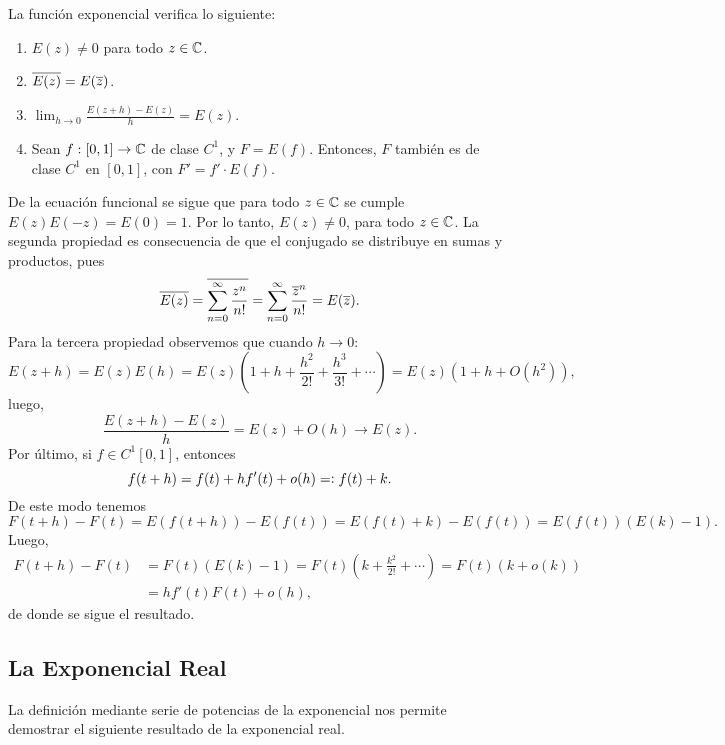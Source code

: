 \begin{theo}\label{teo-propiedades-exp}
    La función exponencial verifica lo siguiente:
    \begin{enumerate}
        \item $E(z)\neq 0$ para todo $z\in \mathbb{C}$.
        \item $\overline{E(z)} = E(\overline{z})$.
        \item $\displaystyle \lim_{h \rightarrow 0} \frac{E(z+h) - E(z)}{h} = E(z)$.
        \item Sean $f: [0,1] \rightarrow \mathbb{C}$ de clase $C^1$, y $F = E(f)$. Entonces, $F$ también es de clase
        $C^1$ en $[0,1]$, con $F' = f'\cdot E(f)$.
    \end{enumerate}
\end{theo}
\begin{dem}
    De la ecuación funcional se sigue que para todo $z\in \mathbb{C}$ se cumple $E(z)E(-z) = E(0) = 1$. Por lo tanto,
    $E(z) \neq 0$, para todo $z\in \mathbb{C}$. La segunda propiedad es consecuencia de que el conjugado se distribuye en 
    sumas y productos, pues
    \[
    \overline{E(z)} = \overline{\sum_{n=0}^{\infty} \frac{z^n}{n!}} = \sum_{n=0}^{\infty}\frac{\overline{z}^n}{n!} = E(\overline{z}).
    \]
    Para la tercera propiedad observemos que cuando $h \rightarrow 0$: 
    \[
    E(z+h)= E(z)E(h) = E(z)\left( 1 + h + \frac{h^2}{2!} + \frac{h^3}{3!} + \cdots \right) = E(z)\left(1+h+ O(h^2) \right),
    \]
    luego, 
    \[
    \frac{E(z+h) - E(z)}{h} = E(z) + O(h) \rightarrow E(z).
    \]
    Por último, si $f\in C^1[0,1]$, entonces 
    \[
    f(t+h) = f(t) + hf'(t) + o(h) = \vcentcolon f(t) + k.
    \]
    De este modo tenemos
    \[
    F(t+h) - F(t) = E(f(t+h)) - E(f(t)) = E(f(t) + k) - E(f(t)) = E(f(t))\left( E(k) - 1 \right).
    \]
    Luego, 
    \begin{align*}
    F(t+h) - F(t) & =  F(t)(E(k) - 1) = F(t)\left( k + \frac{k^2}{2!} + \cdots \right) = F(t)(k + o(k))\\
                  & = hf'(t)F(t) + o(h),
    \end{align*}
    de donde se sigue el resultado.
\end{dem}

\subsection{La Exponencial Real}
La definición mediante serie de potencias de la exponencial nos permite demostrar el siguiente resultado 
de la exponencial real.

